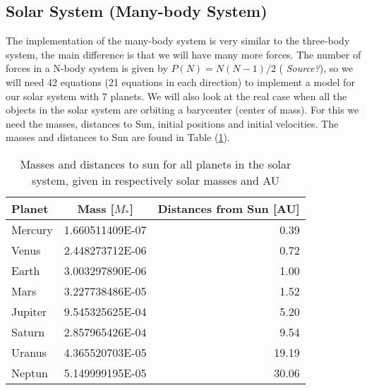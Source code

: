 \documentclass[norsk,a4paper,12pt]{article}
\begin{document}
\subsection{Solar System (Many-body System)}
The implementation of the many-body system is very similar to the three-body system, the main difference is that we will have many more forces. The number of forces in a N-body system is given by $P(N)=N(N-1)/2$ (\emph{\color{red} Source?}), so we will need 42 equations (21 equations in each direction) to implement a model for our solar system with 7 planets. We will also look at the real case when all the objects in the solar system are orbiting a barycenter (center of mass). For this we need the masses, distances to Sun, initial positions and initial velocities. The masses and distances to Sun are found in Table (\ref{table:Masses}).
\begin{table}[H]
\centering
\label{table:Masses}
\caption{Masses and distances to sun for all planets in the solar system, given in respectively solar masses and AU}
\begin{tabular}{lcr}
\hline
Planet           & Mass [$M_*$]           & Distances from Sun [AU] \\
\hline
Mercury 		& 1.660511409E-07      & 0.39    \\
Venus       & 2.448273712E-06      & 0.72    \\
Earth       & 3.003297890E-06      & 1.00    \\
Mars        & 3.227738486E-05      & 1.52    \\
Jupiter     & 9.545325625E-04      & 5.20    \\
Saturn 		& 2.857965426E-04      & 9.54    \\
Uranus 		& 4.365520703E-05      & 19.19   \\
Neptun 		& 5.149999195E-05      & 30.06   \\
\hline
\end{tabular}
\end{table}
\end{document}

